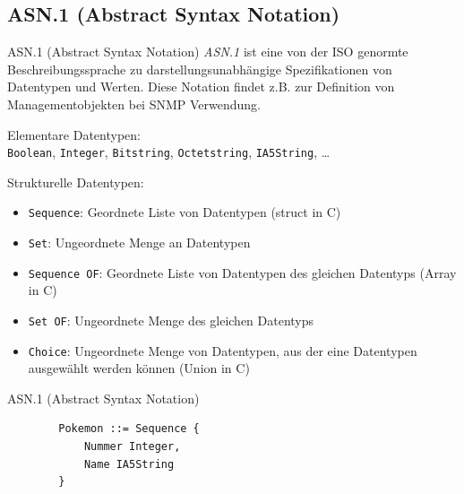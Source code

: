 \subsection{ASN.1 (Abstract Syntax Notation)}

\begin{defi}{ASN.1 (Abstract Syntax Notation)}
    \emph{ASN.1} ist eine von der ISO genormte Beschreibungssprache zu darstellungsunabhängige Spezifikationen von Datentypen und Werten.
    Diese Notation findet z.B. zur Definition von Managementobjekten bei SNMP Verwendung.

    Elementare Datentypen:\\
    \texttt{Boolean}, \texttt{Integer}, \texttt{Bitstring}, \texttt{Octetstring}, \texttt{IA5String}, \ldots

    Strukturelle Datentypen:

    \begin{itemize}
        \item \texttt{Sequence}: Geordnete Liste von Datentypen (struct in C)
        \item \texttt{Set}: Ungeordnete Menge an Datentypen
        \item \texttt{Sequence OF}: Geordnete Liste von Datentypen des gleichen Datentyps (Array in C)
        \item \texttt{Set OF}: Ungeordnete Menge des gleichen Datentyps
        \item \texttt{Choice}: Ungeordnete Menge von Datentypen, aus der eine Datentypen ausgewählt werden können (Union in C)
    \end{itemize}
\end{defi}

\begin{example}{ASN.1 (Abstract Syntax Notation)}
    \begin{lstlisting}
        Pokemon ::= Sequence {
            Nummer Integer,
            Name IA5String
        }
    \end{lstlisting}
\end{example}

